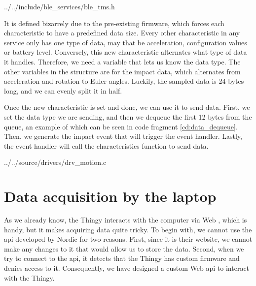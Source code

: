 
{../../include/ble_services/ble_tms.h}

It is defined bizarrely due to the pre-existing firmware, which forces each characteristic to have a predefined data size. Every other characteristic in any service only has one type of data, may that be acceleration, configuration values or battery level. Conversely, this new characteristic alternates what type of data it handles. Therefore, we need a variable that lets us know the data type. The other variables in the structure are for the impact data, which alternates from acceleration and rotation to Euler angles. Luckily, the sampled data is 24-bytes long, and we can evenly split it in half.

Once the new characteristic is set and done, we can use it to send data. First, we set the data type we are sending, and then we dequeue the first 12 bytes from the queue, an example of which can be seen in code fragment \ref{cd:data_dequeue}. Then, we generate the impact event that will trigger the event handler. Lastly, the event handler will call the characteristics function to send data.


{../../source/drivers/drv_motion.c}

\section{Data acquisition by the laptop}
As we already know, the Thingy interacts with the computer via Web \bt, which is handy, but it makes acquiring data quite tricky. To begin with, we cannot use the \gls{api} developed by Nordic for two reasons. First, since it is their website, we cannot make any changes to it that would allow us to store the data. Second, when we try to connect to the \gls{api}, it detects that the Thingy has custom firmware and denies access to it. Consequently, we have designed a custom Web \bt \gls{api} to interact with the Thingy.

